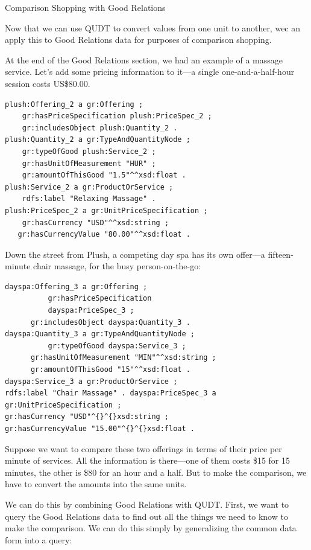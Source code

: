 \begin{challenge}{Comparison Shopping with Good Relations}
\label{chal:38}

Now that we can use QUDT to convert values from one unit to another, wec
an apply this to Good Relations data for purposes of comparison
shopping.

At the end of the Good Relations section, we had an example of a massage
service. Let's add some pricing information to it---a single
one-and-a-half-hour session costs US\$80.00.

\begin{lstlisting}
plush:Offering_2 a gr:Offering ;
    gr:hasPriceSpecification plush:PriceSpec_2 ;
    gr:includesObject plush:Quantity_2 .
plush:Quantity_2 a gr:TypeAndQuantityNode ;
    gr:typeOfGood plush:Service_2 ;
    gr:hasUnitOfMeasurement "HUR" ;
    gr:amountOfThisGood "1.5"^^xsd:float .
plush:Service_2 a gr:ProductOrService ;
    rdfs:label "Relaxing Massage" .
plush:PriceSpec_2 a gr:UnitPriceSpecification ;
    gr:hasCurrency "USD"^^xsd:string ; 
   gr:hasCurrencyValue "80.00"^^xsd:float .
\end{lstlisting}

Down the street from Plush, a competing day spa has its own offer---a
fifteen-minute chair massage, for the busy person-on-the-go:

\begin{lstlisting}
dayspa:Offering_3 a gr:Offering ;
          gr:hasPriceSpecification
          dayspa:PriceSpec_3 ;
	  gr:includesObject dayspa:Quantity_3 .
dayspa:Quantity_3 a gr:TypeAndQuantityNode ;
          gr:typeOfGood dayspa:Service_3 ;
	  gr:hasUnitOfMeasurement "MIN"^^xsd:string ;
	  gr:amountOfThisGood "15"^^xsd:float .
dayspa:Service_3 a gr:ProductOrService ;
rdfs:label "Chair Massage" . dayspa:PriceSpec_3 a
gr:UnitPriceSpecification ;
gr:hasCurrency "USD"^{}^{}xsd:string ;
gr:hasCurrencyValue "15.00"^{}^{}xsd:float .
\end{lstlisting}

Suppose we want to compare these two offerings in terms of their price
per minute of services. All the information is there---one of them costs
\$15 for 15 minutes, the other is \$80 for an hour and a half. But to
make the comparison, we have to convert the amounts into the same units.

We can do this by combining Good Relations with QUDT. First, we want to
query the Good Relations data to find out all the things we need to know
to make the comparison. We can do this simply by generalizing the common
data form into a query:


\end{challenge}
